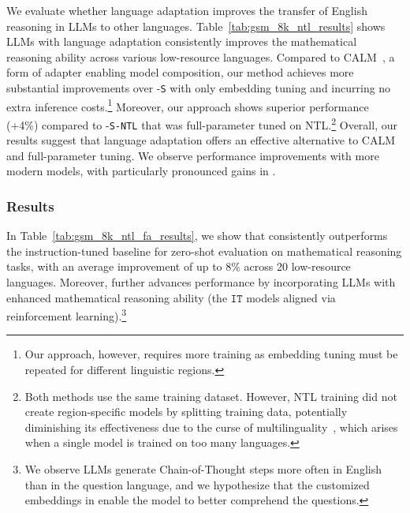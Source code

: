 We evaluate whether language adaptation improves the transfer of English reasoning in LLMs to other languages. Table~\ref{tab:gsm_8k_ntl_results} shows LLMs with language adaptation consistently improves the mathematical reasoning ability across various low-resource languages. Compared to CALM~\citep{bansal2024llm}, a form of adapter enabling model composition, our method achieves more substantial improvements over \palmtwo-\texttt{S} with only embedding tuning and incurring no extra inference costs.\footnote{Our approach, however, requires more training as embedding tuning must be repeated for different linguistic regions.} Moreover, our approach shows superior performance (+4\%) compared to \palmtwo-\texttt{S-NTL} that was full-parameter tuned on NTL.\footnote{Both methods use the same training dataset. However, NTL training did not create region-specific models by splitting training data, potentially diminishing its effectiveness due to the curse of multilinguality~\citep{conneau-etal-2020-unsupervised}, which arises when a single model is trained on too many languages.} Overall, our results suggest that language adaptation offers an effective alternative to CALM and full-parameter tuning. We observe performance improvements with more modern models, with particularly pronounced gains in \gemmatwo.

\subsubsection{\ouradapter Results}\label{sec:franken_adapter_results}

In Table~\ref{tab:gsm_8k_ntl_fa_results}, we show that \ouradapter consistently outperforms the instruction-tuned baseline for zero-shot evaluation on mathematical reasoning tasks, with an average improvement of up to 8\% across 20 low-resource languages. Moreover, \ouradapter further advances performance by incorporating LLMs with enhanced mathematical reasoning ability (\eg the $\texttt{IT}$ models aligned via reinforcement learning).\footnote{We observe LLMs generate Chain-of-Thought steps more often in English than in the question language, and we hypothesize that the customized embeddings in \ouradapter enable the model to better comprehend the questions.}

